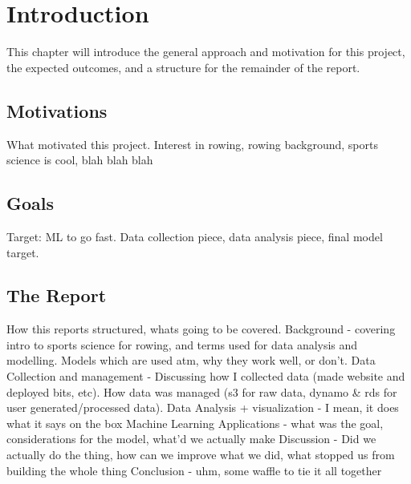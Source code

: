 \chapter{Introduction}
This chapter will introduce the general approach and motivation for this project, the expected outcomes, and a structure for the remainder of the report.

\section{Motivations}
What motivated this project. Interest in rowing, rowing background, sports science is cool, blah blah blah
\section{Goals}
Target: ML to go fast. Data collection piece, data analysis piece, final model target.

\section{The Report}
How this reports structured, whats going to be covered.
Background - covering intro to sports science for rowing, and terms used for data analysis and modelling. Models which are used atm, why they work well, or don't.
Data Collection and management - Discussing how I collected data (made website and deployed bits, etc). How data was managed (s3 for raw data, dynamo \& rds for user generated/processed data).
Data Analysis + visualization - I mean, it does what it says on the box
Machine Learning Applications - what was the goal, considerations for the model, what'd we actually make
Discussion - Did we actually do the thing, how can we improve what we did, what stopped us from building the whole thing
Conclusion - uhm, some waffle to tie it all together

